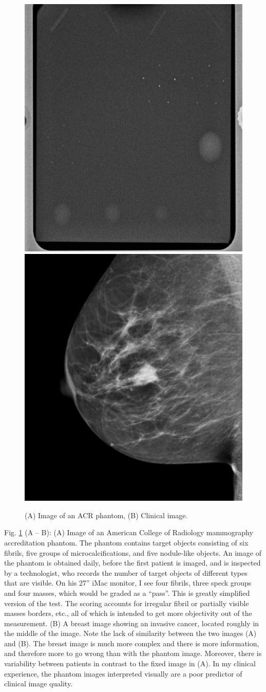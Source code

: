 \documentclass[
]{book}
\begin{document}
\begin{figure}
\includegraphics[width=0.5\linewidth]{images/AcrPhantom} \includegraphics[width=0.5\linewidth]{images/Clinical} \caption{(A) Image of an ACR phantom, (B) Clinical image.}\label{fig:acr-phantom-clinical}
\end{figure}

Fig. \ref{fig:acr-phantom-clinical} (A -- B): (A) Image of an American College of Radiology mammography accreditation phantom. The phantom contains target objects consisting of six fibrils, five groups of microcalcifications, and five nodule-like objects. An image of the phantom is obtained daily, before the first patient is imaged, and is inspected by a technologist, who records the number of target objects of different types that are visible. On his 27'' iMac monitor, I see four fibrils, three speck groups and four masses, which would be graded as a ``pass''. This is greatly simplified version of the test. The scoring accounts for irregular fibril or partially visible masses borders, etc., all of which is intended to get more objectivity out of the measurement. (B) A breast image showing an invasive cancer, located roughly in the middle of the image. Note the lack of similarity between the two images (A) and (B). The breast image is much more complex and there is more information, and therefore more to go wrong than with the phantom image. Moreover, there is variability between patients in contrast to the fixed image in (A). In my clinical experience, the phantom images interpreted visually are a poor predictor of clinical image quality.
\end{document}
